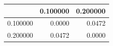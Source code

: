\begin{tabular}{lrr}
\toprule
 & 0.100000 & 0.200000 \\
\midrule
0.100000 & 0.0000 & 0.0472 \\
0.200000 & 0.0472 & 0.0000 \\
\bottomrule
\end{tabular}
